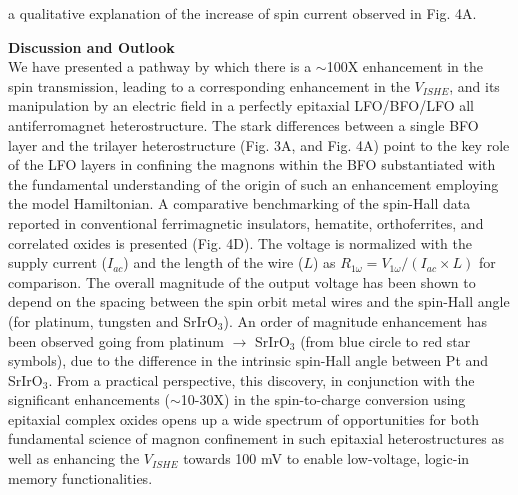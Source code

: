 \documentclass[12pt]{article}
\begin{document}
a qualitative explanation of the increase of spin current observed in Fig. 4A. 


\noindent\textbf{Discussion and Outlook}\\
We have presented a pathway by which there is a $\sim$100X enhancement in the spin transmission, leading to a corresponding enhancement in the $V_{ISHE}$, and its manipulation by an electric field in a perfectly epitaxial LFO/BFO/LFO all antiferromagnet heterostructure. The stark differences between a single BFO layer and the trilayer heterostructure (Fig. 3A, and Fig. 4A) point to the key role of the LFO layers in confining the magnons within the BFO substantiated with the fundamental understanding of the origin of such an enhancement employing the model Hamiltonian. A comparative benchmarking of the spin-Hall data reported in conventional ferrimagnetic insulators, hematite, orthoferrites, and correlated oxides is presented (Fig. 4D). The voltage is normalized with the supply current ($I_{ac}$) and the length of the wire ($L$) as $R_{1\omega}=V_{1\omega}/(I_{ac}\times L)$ for comparison. The overall magnitude of the output voltage has been shown to depend on the spacing between the spin orbit metal wires and the spin-Hall angle (for platinum, tungsten and SrIrO$_3$). An order of magnitude enhancement has been observed going from platinum $\rightarrow$ SrIrO$_3$ (from blue circle  to red star symbols), due to the difference in the intrinsic spin-Hall angle between Pt and SrIrO$_3$. From a practical perspective, this discovery, in conjunction with the significant enhancements ($\sim$10-30X) in the spin-to-charge conversion using epitaxial complex oxides\cite{huang2024manipulating} opens up a wide spectrum of opportunities for both fundamental science of magnon confinement in such epitaxial heterostructures as well as enhancing the $V_{ISHE}$ towards 100 mV\cite{manipatruni2019scalable} to enable low-voltage, logic-in memory functionalities.\\


    
    
\end{document}
